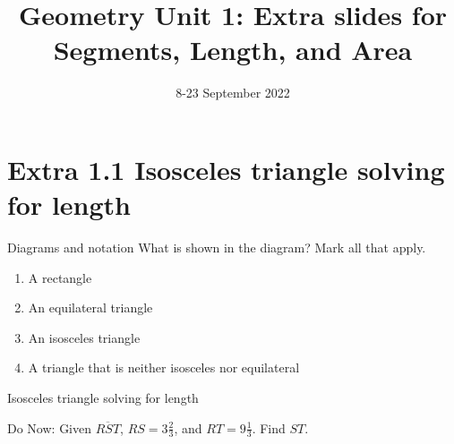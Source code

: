 

\title{Geometry Unit 1: Extra slides for Segments, Length, and Area}
\date{8-23 September 2022}


\frame{\titlepage}

\section[Outline]{}
\frame{\tableofcontents}

\section{Extra 1.1 Isosceles triangle solving for length }

\begin{frame}{Diagrams and notation}
  What is shown in the diagram? Mark all that apply.
  \begin{enumerate}
    \item A rectangle
    \item An equilateral triangle
    \item An isosceles triangle
    \item A triangle that is neither isosceles nor equilateral
  \end{enumerate}
  \begin{center}
  \end{center}
\end{frame}

\begin{frame}{Isosceles triangle solving for length}
  \begin{block}{Do Now: Given $\overline{RST}$, $RS=3 \frac{2}{3}$, and $RT=9 \frac{1}{3}$. Find ${ST}$.}\vspace{0.5cm}
  \end{block} \vspace{0.5cm}
\end{frame}

